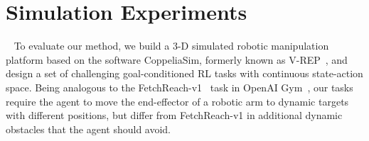 \documentclass[journal]{IEEEtran}
\begin{document}
\section{Simulation Experiments}~\label{experiments}
To evaluate our method, we build a 3-D simulated robotic manipulation platform based on the software CoppeliaSim, formerly known as V-REP~\citep{rohmer2013v}, and design a set of challenging goal-conditioned RL tasks with continuous state-action space. 
Being analogous to the FetchReach-v1~\citep{plappert2018multi} task in OpenAI Gym~\citep{brockman2016openai}, our tasks require the agent to move the end-effector of a robotic arm to dynamic targets with different positions, but differ from FetchReach-v1 in additional dynamic obstacles that the agent should avoid.
\end{document}
